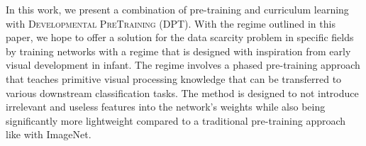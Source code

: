 \noindent
In this work, we present a combination of pre-training and curriculum learning with \textsc{Developmental PreTraining} (DPT). With the regime outlined in this paper, we hope to offer a solution for the data scarcity problem in specific fields by training networks with a regime that is designed with inspiration from early visual development in infant. The regime involves a phased pre-training approach that teaches primitive visual processing knowledge that can be transferred to various downstream classification tasks. The method is designed to not introduce irrelevant and useless features into the network's weights while also being significantly more lightweight compared to a traditional pre-training approach like with ImageNet.